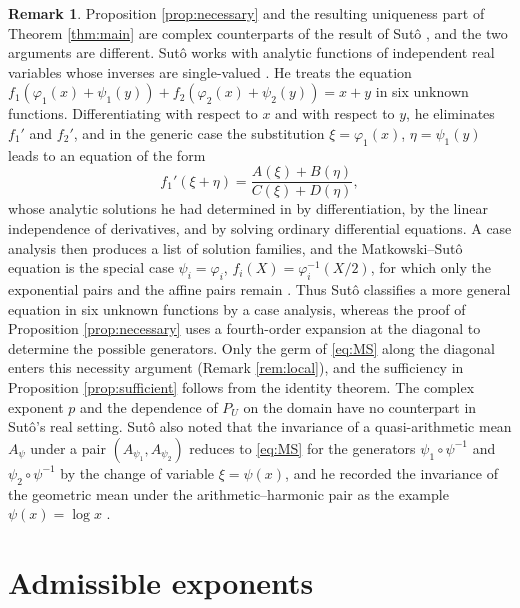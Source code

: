 \documentclass[a4paper, reqno, 11pt]{amsart}
\theoremstyle{definition}
\newtheorem{Rem}[Thm]{Remark}
\begin{document}
\begin{Rem}\label{rem:suto}
Proposition \ref{prop:necessary} and the resulting uniqueness part of Theorem \ref{thm:main} are complex counterparts of the result of Sut\^o \cite[Section  2]{Suto2}, and the two arguments are different.
Sut\^o works with analytic functions of independent real variables whose inverses are single-valued \cite[p.~82 and p.~99]{Suto2}.
He treats the equation $f_1(\varphi_1(x) + \psi_1(y)) + f_2(\varphi_2(x) + \psi_2(y)) = x + y$ in six unknown functions.
Differentiating with respect to $x$ and with respect to $y$, he eliminates $f_1'$ and $f_2'$, and in the generic case the substitution $\xi = \varphi_1(x)$, $\eta = \psi_1(y)$ leads to an equation of the form
\begin{equation*}
f_1'(\xi + \eta) = \frac{A(\xi) + B(\eta)}{C(\xi) + D(\eta)},
\end{equation*}
whose analytic solutions he had determined in \cite[Section  3]{Suto1} by differentiation, by the linear independence of derivatives, and by solving ordinary differential equations.
A case analysis then produces a list of solution families, and the Matkowski--Sut\^o equation is the special case $\psi_i = \varphi_i$, $f_i(X) = \varphi_i^{-1}(X/2)$, for which only the exponential pairs and the affine pairs remain \cite[Section  2]{Suto2}.
Thus Sut\^o classifies a more general equation in six unknown functions by a case analysis, whereas the proof of Proposition \ref{prop:necessary} uses a fourth-order expansion at the diagonal to determine the possible generators.
Only the germ of \eqref{eq:MS} along the diagonal enters this necessity argument (Remark \ref{rem:local}), and the sufficiency in Proposition \ref{prop:sufficient} follows from the identity theorem.
The complex exponent $p$ and the dependence of $P_U$ on the domain have no counterpart in Sut\^o's real setting.
Sut\^o also noted that the invariance of a quasi-arithmetic mean $A_{\psi}$ under a pair $(A_{\psi_1}, A_{\psi_2})$ reduces to \eqref{eq:MS} for the generators $\psi_1 \circ \psi^{-1}$ and $\psi_2 \circ \psi^{-1}$ by the change of variable $\xi = \psi(x)$, and he recorded the invariance of the geometric mean under the arithmetic--harmonic pair as the example $\psi (x) = \log x$ \cite[Section  3]{Suto2}.
\end{Rem}

\section{Admissible exponents}\label{sec:P}
\end{document}
